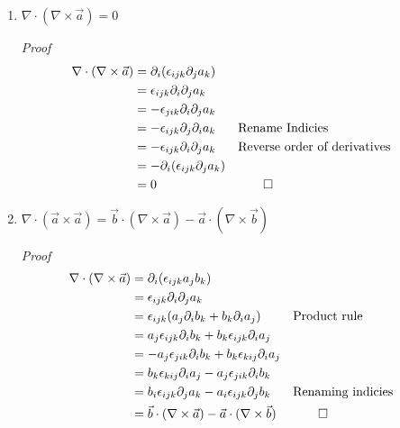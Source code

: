 \documentclass[11pt,twoside]{article}
\renewcommand{\d}{\partial}
\newcommand{\vect}[1]{\vec{#1}}
\newcommand{\grad}{\nabla}
\newcommand{\cross}{\times}
\begin{document}
\begin{enumerate}
%
%
\item $\grad\cdot(\grad\cross\vect{a})=0$

\textit{Proof}
\begin{align*}
\grad\cdot(\grad\cross\vect{a}) & = \d_i(\epsilon_{ijk}\d_ja_k)\\
                                & =  \epsilon_{ijk}\d_i\d_ja_k\\
                                & = -\epsilon_{jik}\d_i\d_ja_k\\
                                & = -\epsilon_{ijk}\d_j\d_ia_k && \text{Rename Indicies}\\
                                & = -\epsilon_{ijk}\d_i\d_ja_k && \text{Reverse order of derivatives}\\
                                & = -\d_i(\epsilon_{ijk}\d_ja_k)\\
                                & = 0 && \qed\\
\end{align*}


%
%
\item $\grad\cdot(\vect{a}\cross\vect{a})=\vect{b}\cdot(\grad\cross\vect{a})-\vect{a}\cdot(\grad\cross\vect{b})$

\textit{Proof} 
\begin{align*}
\grad\cdot(\grad\cross\vect{a}) & = \d_i(\epsilon_{ijk}a_jb_k)\\
                                & = \epsilon_{ijk}\d_i\d_ja_k\\
                                & = \epsilon_{ijk}(a_j\d_ib_k+b_k\d_ia_j) && \text{Product rule}\\
                                & = a_j\epsilon_{ijk}\d_ib_k+b_k\epsilon_{ijk}\d_ia_j\\
                                & = -a_j\epsilon_{jik}\d_ib_k+b_k\epsilon_{kij}\d_ia_j\\
                                & = b_k\epsilon_{kij}\d_ia_j-a_j\epsilon_{jik}\d_ib_k\\
                                & = b_i\epsilon_{ijk}\d_ja_k-a_i\epsilon_{ijk}\d_jb_k &&\text{Renaming indicies}\\
                                & = \vect{b}\cdot(\grad\cross\vect{a})-\vect{a}\cdot(\grad\cross\vect{b})&& \qed
\end{align*}



\end{enumerate}
\end{document}
